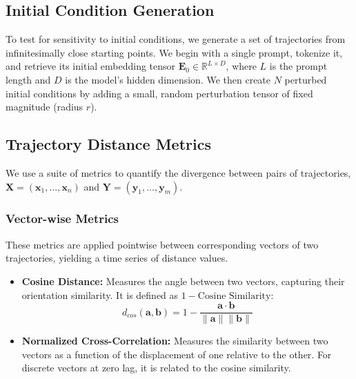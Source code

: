 \documentclass[a4paper,12pt]{article}
\begin{document}
\subsection{Initial Condition Generation}
To test for sensitivity to initial conditions, we generate a set of trajectories from infinitesimally close starting points. We begin with a single prompt, tokenize it, and retrieve its initial embedding tensor $\mathbf{E}_0 \in \mathbb{R}^{L \times D}$, where $L$ is the prompt length and $D$ is the model's hidden dimension. We then create $N$ perturbed initial conditions by adding a small, random perturbation tensor of fixed magnitude (radius $r$).

\subsection{Trajectory Distance Metrics}
We use a suite of metrics to quantify the divergence between pairs of trajectories, $\mathbf{X} = (\mathbf{x}_1, ..., \mathbf{x}_n)$ and $\mathbf{Y} = (\mathbf{y}_1, ..., \mathbf{y}_m)$.

\subsubsection{Vector-wise Metrics}
These metrics are applied pointwise between corresponding vectors of two trajectories, yielding a time series of distance values.
\begin{itemize}
    \item \textbf{Cosine Distance:} Measures the angle between two vectors, capturing their orientation similarity. It is defined as $1 - \text{Cosine Similarity}$:
    \begin{equation}
        d_{cos}(\mathbf{a}, \mathbf{b}) = 1 - \frac{\mathbf{a} \cdot \mathbf{b}}{\|\mathbf{a}\| \|\mathbf{b}\|}
    \end{equation}
    \item \textbf{Normalized Cross-Correlation:} Measures the similarity between two vectors as a function of the displacement of one relative to the other. For discrete vectors at zero lag, it is related to the cosine similarity.
\end{itemize}
\end{document}
